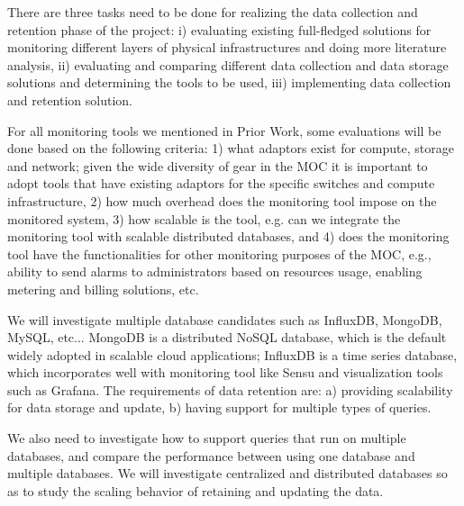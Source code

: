 There are three tasks need to be done for realizing the data collection and retention phase of the project: i) evaluating existing full-fledged solutions for monitoring different layers of physical infrastructures and doing more literature analysis, ii) evaluating and comparing different data collection and data storage solutions and determining the tools to be used, iii) implementing data collection and retention solution. 

For all monitoring tools we mentioned in Prior Work, some evaluations will be done based on the following criteria: 1) what adaptors exist for compute, storage and network; given the wide diversity of gear in the MOC it is important to adopt tools that have existing adaptors for the specific switches and compute infrastructure, 2) how much overhead does the monitoring tool impose on the monitored system, 3) how scalable is the tool, e.g. can we integrate the monitoring tool with scalable distributed databases, and 4) does the monitoring tool have the functionalities for other monitoring purposes of the MOC, e.g., ability to send alarms to administrators based on resources usage, enabling metering and billing solutions, etc.

We will investigate multiple database candidates such as InfluxDB, MongoDB, MySQL, etc... MongoDB is a distributed NoSQL database, which is the default widely adopted in scalable cloud applications; InfluxDB is a time series database, which incorporates well with monitoring tool like Sensu and visualization tools such as Grafana. The requirements of data retention are: a) providing scalability for data storage and update, b) having support for multiple types of queries.

We also need to investigate how to support queries that run on multiple databases, and compare the performance between using one database and multiple databases. We will investigate centralized and distributed databases so as to study the scaling behavior of retaining and updating the data.

